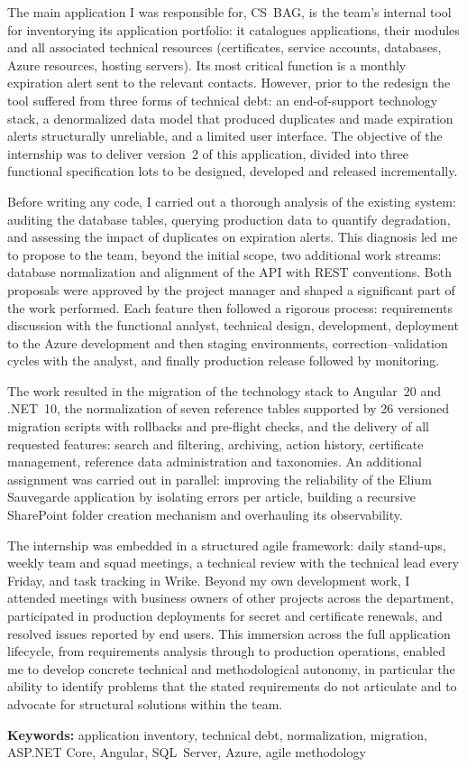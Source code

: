 The main application I was responsible for, CS~BAG, is the team's internal tool
for inventorying its application portfolio: it catalogues applications, their
modules and all associated technical resources (certificates, service accounts,
databases, Azure resources, hosting servers). Its most critical function is a
monthly expiration alert sent to the relevant contacts. However, prior to the
redesign the tool suffered from three forms of technical debt: an end-of-support
technology stack, a denormalized data model that produced duplicates and made
expiration alerts structurally unreliable, and a limited user interface. The
objective of the internship was to deliver version~2 of this application,
divided into three functional specification lots to be designed, developed and
released incrementally.

Before writing any code, I carried out a thorough analysis of the existing
system: auditing the database tables, querying production data to quantify
degradation, and assessing the impact of duplicates on expiration alerts. This
diagnosis led me to propose to the team, beyond the initial scope, two
additional work streams: database normalization and alignment of the API with
REST conventions. Both proposals were approved by the project manager and shaped
a significant part of the work performed. Each feature then followed a rigorous
process: requirements discussion with the functional analyst, technical design,
development, deployment to the Azure development and then staging environments,
correction--validation cycles with the analyst, and finally production release
followed by monitoring.

The work resulted in the migration of the technology stack to Angular~20 and
.NET~10, the normalization of seven reference tables supported by 26 versioned
migration scripts with rollbacks and pre-flight checks, and the delivery of all
requested features: search and filtering, archiving, action history, certificate
management, reference data administration and taxonomies. An additional
assignment was carried out in parallel: improving the reliability of the
Elium Sauvegarde application by isolating errors per article, building a
recursive SharePoint folder creation mechanism and overhauling its
observability.

The internship was embedded in a structured agile framework: daily stand-ups,
weekly team and squad meetings, a technical review with the technical lead every
Friday, and task tracking in Wrike. Beyond my own development work, I attended
meetings with business owners of other projects across the department,
participated in production deployments for secret and certificate renewals, and
resolved issues reported by end users. This immersion across the full
application lifecycle, from requirements analysis through to production
operations, enabled me to develop concrete technical and methodological
autonomy, in particular the ability to identify problems that the stated
requirements do not articulate and to advocate for structural solutions within
the team.

\vspace{0.5em}
\noindent\textbf{Keywords:} application inventory, technical debt,
normalization, migration, ASP.NET Core, Angular, SQL~Server, Azure, agile
methodology
